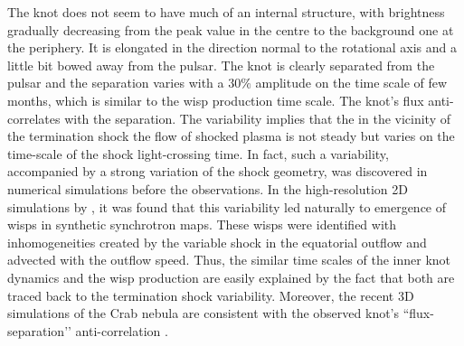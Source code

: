 The knot does not seem to have much of an internal structure, with brightness gradually decreasing from the peak value in the centre to the background one at the periphery. It is elongated in the direction normal to the rotational axis and a little bit bowed away from the pulsar. The knot is clearly separated from the pulsar and the separation varies with  a $30\%$ amplitude on the time scale of few months, which is similar to the wisp production time scale.   The knot’s flux anti-correlates with the separation.      
The variability implies that the in the vicinity of the termination shock the flow of shocked plasma is not steady but varies on the time-scale of the shock light-crossing time.  In fact, such a variability, accompanied by a strong variation of the shock geometry, was  discovered in numerical simulations before the observations. In the high-resolution 2D simulations by \citet{camus-09}, it was found that this variability led naturally to emergence of wisps in synthetic synchrotron maps.  These wisps were identified with inhomogeneities created by the variable shock in the  equatorial outflow and advected with the outflow speed.  Thus, the similar time scales of the inner knot dynamics and the wisp production are easily explained by the fact that both are traced back to the termination shock variability.  Moreover, the recent 3D simulations of the Crab nebula are consistent with the observed knot’s ``flux-separation’’ anti-correlation \citep{porth-14}.    